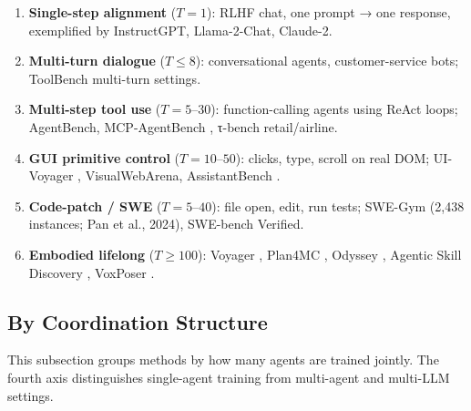 \documentclass{article}
\begin{document}
\begin{enumerate}
\def\labelenumi{\arabic{enumi}.}

\item
  \textbf{Single-step alignment} (\(T=1\)): RLHF chat, one prompt → one response, exemplified by InstructGPT, Llama-2-Chat, Claude-2.
\item
  \textbf{Multi-turn dialogue} (\(T \le 8\)): conversational agents, customer-service bots; ToolBench multi-turn settings.
\item
  \textbf{Multi-step tool use} (\(T = 5\text{–}30\)): function-calling agents using ReAct loops; AgentBench, MCP-AgentBench \citep{guo20252025}, τ-bench retail/airline.
\item
  \textbf{GUI primitive control} (\(T = 10\text{–}50\)): clicks, type, scroll on real DOM; UI-Voyager \citep{lin20262026}, VisualWebArena, AssistantBench \citep{yoran20242024}.
\item
  \textbf{Code-patch / SWE} (\(T = 5\text{–}40\)): file open, edit, run tests; SWE-Gym (2,438 instances; Pan et al., 2024), SWE-bench Verified.
\item
  \textbf{Embodied lifelong} (\(T \ge 100\)): Voyager \citep{wang20232023}, Plan4MC \citep{yuan20232023}, Odyssey \citep{liu20242024}, Agentic Skill Discovery \citep{zhao2024agenticskilldiscov}, VoxPoser \citep{huang20232023}.
\end{enumerate}

\subsection{By Coordination Structure}\label{by-coordination-structure}

This subsection groups methods by how many agents are trained jointly. The fourth axis distinguishes single-agent training from multi-agent and multi-LLM settings.
\end{document}
